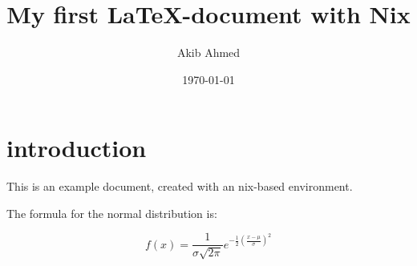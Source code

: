 \documentclass[a4paper,12pt]{scrartcl}
\title{My first \LaTeX-document with Nix}
\author{Akib Ahmed}
\date{\today}
\begin{document}
\maketitle

\section{introduction}

This is an example document, created with an nix-based environment.

The formula for the normal distribution is:

\[
  f(x) = \frac{1}{\sigma\sqrt{2\pi}}
         e^{-\frac{1}{2}\left(\frac{x-\mu}{\sigma}\right)^2}
\]
\end{document}
